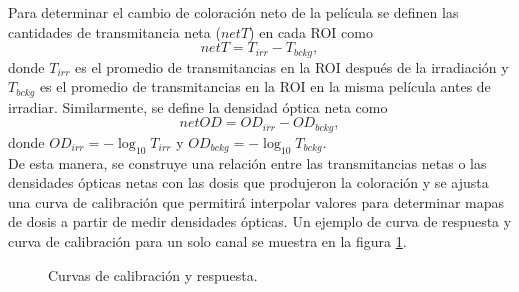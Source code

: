 Para determinar el cambio de coloración neto de la película se definen las cantidades de transmitancia neta ($netT$) en cada ROI como
\begin{equation}
	netT=T_{irr}-T_{bckg},
\end{equation}
donde $T_{irr}$ es el promedio de transmitancias en la ROI después de la irradiación y $T_{bckg}$ es el promedio de transmitancias en la ROI en la misma película antes de irradiar. Similarmente, se define la densidad óptica neta como 
\begin{equation}
	netOD=OD_{irr}-OD_{bckg},
\end{equation}
donde $OD_{irr}=-\log_{10}T_{irr}$ y $OD_{bckg}=-\log_{10}T_{bckg}$.\\

De esta manera, se construye una relación entre las transmitancias netas o las densidades ópticas netas con las dosis que produjeron la coloración y se ajusta una curva de calibración que permitirá interpolar valores para determinar mapas de dosis a partir de medir densidades ópticas. Un ejemplo de curva de respuesta y curva de calibración para un solo canal se muestra en la figura \ref{fig:Curvas}.

\begin{figure}[H]
	\centering
	\hfill
	\caption{Curvas de calibración y respuesta.}
	\label{fig:Curvas}
\end{figure}

